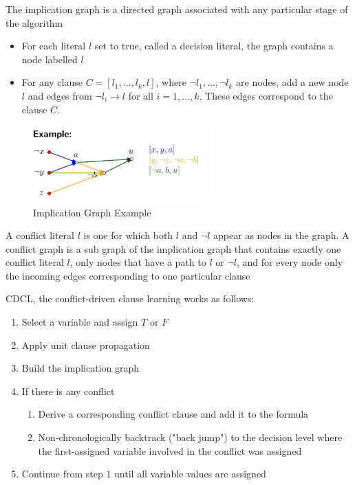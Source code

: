 \documentclass[a4paper]{article}
\theoremstyle{plain}
\theoremstyle{definition}
\newtheorem{defn}{Definition}[section]
\theoremstyle{remark}
\begin{document}
\begin{tcolorbox}[colback=black!3!white,colframe=black!60!white,title=\begin{defn}Implication Graph \label{Implication Graph}\end{defn}]
The implication graph is a directed graph associated with any particular stage of the algorithm
\begin{itemize}
	\item For each literal $l$ set to true, called a decision literal, the graph contains a node labelled $l$ 
	\item For any clause $C = [l_1,\ldots,l_k,l]$, where $\neg l_1, \ldots, \neg l_k$ are nodes, add a new node $l$ and edges from $\neg l_i \to l$ for all $i = 1,\ldots,k$. These edges correspond to the clause $C$.
\end{itemize}
\begin{figure}[H]
	\centering
	\includegraphics[width=0.6\textwidth]{two.png}
	\caption{Implication Graph Example}
	\label{fig:two-png}
\end{figure}
A conflict literal $l$ is one for which both $l$ and $\neg l$ appear as nodes in the graph. A conflict graph is a sub graph of the implication graph that contains exactly one conflict literal $l$, only nodes that have a path to $l$ or $\neg l$, and for every node only the incoming edges corresponding to one particular clause
\end{tcolorbox}
\begin{tcolorbox}[colback=black!3!white,colframe=black!60!white,title=\begin{defn}CDCL Algorithm \label{CDCL Algorithm}\end{defn}]
CDCL, the conflict-driven clause learning works as follows:
\begin{enumerate}
	\item Select a variable and assign $T$ or $F$ 
	\item Apply unit clause propagation
	\item Build the implication graph
	\item If there is any conflict
		\begin{enumerate}
			\item Derive a corresponding conflict clause and add it to the formula
			\item Non-chronologically backtrack ("back jump") to the decision level where the first-assigned variable involved in the conflict was assigned
		\end{enumerate}
	\item Continue from step $1$ until all variable values are assigned
\end{enumerate}
\begin{align}

\end{align}
\end{tcolorbox}
\end{document}
